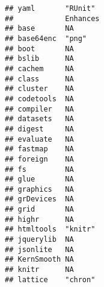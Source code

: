\documentclass[
]{article}
\begin{document}
\begin{verbatim}
## yaml       "RUnit"                                                                                                                                                                                                                                                                                                                                            
##            Enhances                                                             
## base       NA                                                                   
## base64enc  "png"                                                                
## boot       NA                                                                   
## bslib      NA                                                                   
## cachem     NA                                                                   
## class      NA                                                                   
## cluster    NA                                                                   
## codetools  NA                                                                   
## compiler   NA                                                                   
## datasets   NA                                                                   
## digest     NA                                                                   
## evaluate   NA                                                                   
## fastmap    NA                                                                   
## foreign    NA                                                                   
## fs         NA                                                                   
## glue       NA                                                                   
## graphics   NA                                                                   
## grDevices  NA                                                                   
## grid       NA                                                                   
## highr      NA                                                                   
## htmltools  "knitr"                                                              
## jquerylib  NA                                                                   
## jsonlite   NA                                                                   
## KernSmooth NA                                                                   
## knitr      NA                                                                   
## lattice    "chron"                                                              

\end{verbatim}
\end{document}
